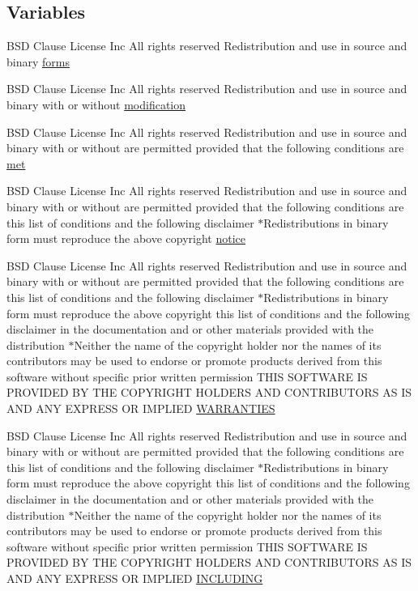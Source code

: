 \subsection*{Variables}
\begin{DoxyCompactItemize}
\item 
B\+SD Clause License Inc All rights reserved Redistribution and use in source and binary \hyperlink{LICENSE_8txt_a0a1fef0f3174b6df470895054ed01e51}{forms}
\item 
B\+SD Clause License Inc All rights reserved Redistribution and use in source and binary with or without \hyperlink{LICENSE_8txt_afdee13c8c8c1061395c59e5c5de1a3c6}{modification}
\item 
B\+SD Clause License Inc All rights reserved Redistribution and use in source and binary with or without are permitted provided that the following conditions are \hyperlink{LICENSE_8txt_ab7f07fad302c934549e076cb99c8b69b}{met}
\item 
B\+SD Clause License Inc All rights reserved Redistribution and use in source and binary with or without are permitted provided that the following conditions are this list of conditions and the following disclaimer $\ast$Redistributions in binary form must reproduce the above copyright \hyperlink{LICENSE_8txt_a8a2e1e600c30d90e063df4e722f9052b}{notice}
\item 
B\+SD Clause License Inc All rights reserved Redistribution and use in source and binary with or without are permitted provided that the following conditions are this list of conditions and the following disclaimer $\ast$Redistributions in binary form must reproduce the above copyright this list of conditions and the following disclaimer in the documentation and or other materials provided with the distribution $\ast$Neither the name of the copyright holder nor the names of its contributors may be used to endorse or promote products derived from this software without specific prior written permission T\+H\+IS S\+O\+F\+T\+W\+A\+RE IS P\+R\+O\+V\+I\+D\+ED BY T\+HE C\+O\+P\+Y\+R\+I\+G\+HT H\+O\+L\+D\+E\+RS A\+ND C\+O\+N\+T\+R\+I\+B\+U\+T\+O\+RS AS IS A\+ND A\+NY E\+X\+P\+R\+E\+SS OR I\+M\+P\+L\+I\+ED \hyperlink{LICENSE_8txt_a8472295fc7dc3e152751655a351cab17}{W\+A\+R\+R\+A\+N\+T\+I\+ES}
\item 
B\+SD Clause License Inc All rights reserved Redistribution and use in source and binary with or without are permitted provided that the following conditions are this list of conditions and the following disclaimer $\ast$Redistributions in binary form must reproduce the above copyright this list of conditions and the following disclaimer in the documentation and or other materials provided with the distribution $\ast$Neither the name of the copyright holder nor the names of its contributors may be used to endorse or promote products derived from this software without specific prior written permission T\+H\+IS S\+O\+F\+T\+W\+A\+RE IS P\+R\+O\+V\+I\+D\+ED BY T\+HE C\+O\+P\+Y\+R\+I\+G\+HT H\+O\+L\+D\+E\+RS A\+ND C\+O\+N\+T\+R\+I\+B\+U\+T\+O\+RS AS IS A\+ND A\+NY E\+X\+P\+R\+E\+SS OR I\+M\+P\+L\+I\+ED \hyperlink{LICENSE_8txt_aa4b11f541e6ee38e9eb74721057af7f2}{I\+N\+C\+L\+U\+D\+I\+NG}

\end{DoxyCompactItemize}
